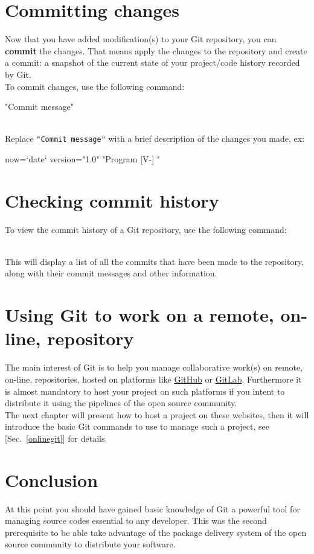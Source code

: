 \section{Committing changes}

Now that you have added modification(s) to your Git repository, you can {\bf{commit}} the changes. 
That means apply the changes to the repository and create a commit: a snapshot of the current state of your project/code history recorded by Git. \\
To commit changes, use the following command:
\begin{script}
    "Commit message"
\end{script}
\\[-0.25cm]
\noindent Replace \texttt{"Commit message"} with a brief description of the changes you made, ex:
\begin{script}
 now=`date`
 version="1.0"
     "Program [V-] "
\end{script}

\section{Checking commit history}

To view the commit history of a Git repository, use the following command:
\begin{script}
  
\end{script}
\\[-0.25cm]
\noindent This will display a list of all the commits that have been made to the repository, 
along with their commit messages and other information.

\section{Using Git to work on a remote, on-line, repository}

The main interest of Git is to help you manage collaborative work(s) on remote, on-line, repositories, hosted on platforms like \href{https://github.com}{GitHub} or \href{https://gitlab.com}{GitLab}. 
Furthermore it is almost mandatory to host your project on such platforms if you intent to distribute it using the pipelines of the open source community. \\
The next chapter will present how to host a project on these websites, then it will introduce the basic Git commands to use to manage such a project, see [Sec.~\ref{onlinegit}] for details. 

\section{Conclusion}

At this point you should have gained basic knowledge of Git a powerful tool for managing source codes essential to any developer. 
This was the second prerequisite to be able take advantage of the package delivery system of the open source community to distribute your software.

